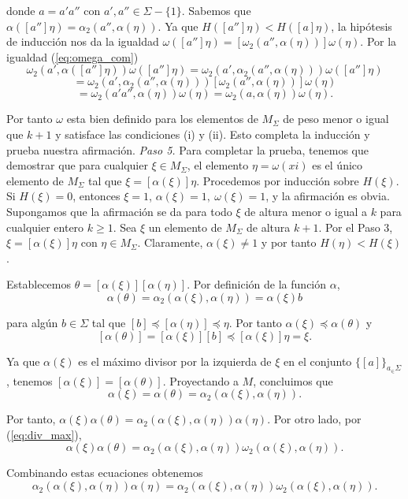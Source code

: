 \documentclass[12pt]{article}
\theoremstyle{definition}
\begin{document}
donde $a=a'a''$ con $a',a''\in\Sigma-\{1\}$. Sabemos que $\alpha([a'']\eta)=\alpha_2(a'',\alpha(\eta))$. Ya que $H([a'']\eta) < H([a]\eta)$, la hipótesis de inducción nos da la igualdad $\omega([a'']\eta)=[\omega_2(a'',\alpha(\eta))]\omega(\eta)$. Por la igualdad (\ref{eq:omega_com})
$$\omega_2(a',\alpha([a'']\eta))\omega([a'']\eta)=\omega_2(a',\alpha_2(a'',\alpha(\eta)))\omega([a'']\eta)$$
$$= \omega_2(a',\alpha_2(a'',\alpha(\eta)))[\omega_2(a'',\alpha(\eta))]\omega(\eta)$$
$$ =\omega_2(a'a'',\alpha(\eta))\omega(\eta)=  \omega_2(a,\alpha(\eta))\omega(\eta).$$

Por tanto $\omega$ esta bien definido para los elementos de $M_\Sigma$ de peso menor o igual que $k+1$ y satisface las condiciones (i) y (ii). Esto completa la inducción y prueba nuestra afirmación.
\newline
\newline
\textit{Paso 5.} Para completar la prueba, tenemos que demostrar que para cualquier $\xi\in M_\Sigma$, el elemento $\eta = \omega(xi)$ es el único elemento de $M_\Sigma$ tal que $\xi = [\alpha(\xi)]\eta$. Procedemos por inducción sobre $H(\xi)$. Si $H(\xi) = 0$, entonces $\xi = 1$, $\alpha(\xi) = 1,\ \omega(\xi) = 1$, y la afirmación es obvia. Supongamos que la afirmación se da para todo $\xi$ de altura menor o igual a $k$ para cualquier entero $k\geq 1$. Sea $\xi$ un elemento de $M_\Sigma$ de  altura $k+1$. Por el Paso 3, $\xi=[\alpha(\xi)]\eta$ con $\eta\in M_\Sigma$. Claramente, $\alpha(\xi)\neq 1$ y por tanto $H(\eta) < H(\xi)$.

Establecemos $\theta=[\alpha(\xi)][\alpha(\eta)]$. Por definición de la función $\alpha$,
$$\alpha(\theta)=\alpha_2(\alpha(\xi),\alpha(\eta))=\alpha(\xi)b$$

para algún $b\in\Sigma$ tal que $[b]\preceq [\alpha(\eta)]\preceq\eta$. Por tanto $\alpha(\xi)\preceq\alpha(\theta)$ y 
$$[\alpha(\theta)] = [\alpha(\xi)][b]\preceq[\alpha(\xi)]\eta=\xi.$$

Ya que $\alpha(\xi)$ es el máximo divisor por la izquierda de $\xi$ en el conjunto $\{[a]\}_{a_\in\Sigma}$, tenemos $[\alpha(\xi)]=[\alpha(\theta)]$. Proyectando a $M$, concluimos que
$$\alpha(\xi)=\alpha(\theta) = \alpha_2(\alpha(\xi),\alpha(\eta)).$$

Por tanto, $\alpha(\xi)\alpha(\theta)=\alpha_2(\alpha(\xi),\alpha(\eta))\alpha(\eta)$. Por otro lado, por (\ref{eq:div_max}),
$$\alpha(\xi)\alpha(\theta)=\alpha_2(\alpha(\xi),\alpha(\eta))\omega_2(\alpha(\xi),\alpha(\eta)).$$

Combinando estas ecuaciones obtenemos
$$\alpha_2(\alpha(\xi),\alpha(\eta))\alpha(\eta) = \alpha_2(\alpha(\xi),\alpha(\eta))\omega_2(\alpha(\xi),\alpha(\eta)).$$
\end{document}
